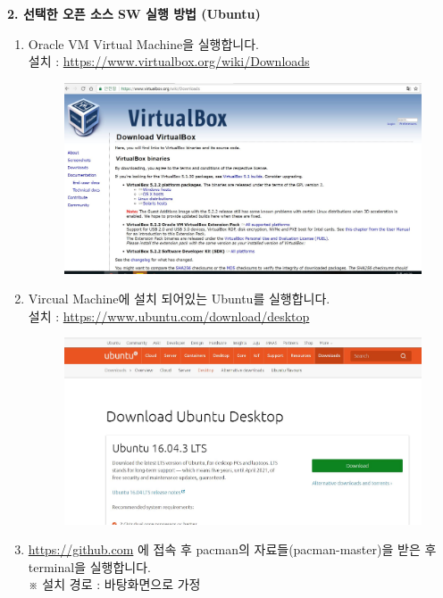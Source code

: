 \documentclass{article}
\begin{document}
 
\begin{large}\textbf{2. 선택한 오픈 소스 SW 실행 방법 (Ubuntu)}\end{large}
\begin{enumerate}
\item Oracle VM Virtual Machine을 실행합니다. \\

설치 : \url{https://www.virtualbox.org/wiki/Downloads}\\ 
 \begin{figure}[!h]
\centering
\includegraphics[width=1\columnwidth]{install}
\end{figure}

\newpage

\item Vircual Machine에 설치 되어있는 Ubuntu를 실행합니다. \\
설치 : \url{https://www.ubuntu.com/download/desktop}\\

 \begin{figure}[!h]
\centering
\includegraphics[width=1\columnwidth]{ubuntu}
\end{figure}

\item \url{https://github.com} 에 접속 후 pacman의 자료들(pacman-master)을 받은 후 terminal을 실행합니다. \\※ 설치 경로 : 바탕화면으로 가정\\


\end{enumerate}
\end{document}
